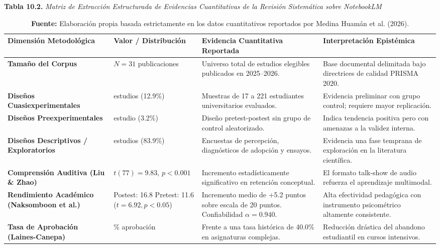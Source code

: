 \vspace{0.4cm}
\begin{table}[htpb!]
\centering
\small
\textbf{Tabla 10.2.} \textit{Matriz de Extracción Estructurada de Evidencias Cuantitativas de la Revisión Sistemática sobre NotebookLM}\\[0.25cm]
\footnotesize
\renewcommand{\arraystretch}{1.4}
\begin{tabularx}{\textwidth}{>{\raggedright\arraybackslash\bfseries}p{2.8cm} >{\raggedright\arraybackslash}p{2.2cm} >{\raggedright\arraybackslash}X >{\raggedright\arraybackslash}X}
\toprule
Dimensión Metodológica & Valor / Distribución & Evidencia Cuantitativa Reportada & Interpretación Epistémica \\
\midrule
Tamaño del Corpus & $N = 31$ publicaciones & Universo total de estudios elegibles publicados en 2025--2026. & Base documental delimitada bajo directrices de calidad PRISMA 2020. \\
Diseños Cuasiexperimentales & 4 estudios (12.9\%) & Muestras de 17 a 221 estudiantes universitarios evaluados. & Evidencia preliminar con grupo control; requiere mayor replicación. \\
Diseños Preexperimentales & 1 estudio (3.2\%) & Diseño pretest-postest sin grupo de control aleatorizado. & Indica tendencia positiva pero con amenazas a la validez interna. \\
Diseños Descriptivos / Exploratorios & 26 estudios (83.9\%) & Encuestas de percepción, diagnósticos de adopción y ensayos. & Evidencia una fase temprana de exploración en la literatura científica. \\
Comprensión Auditiva (Liu \& Zhao) & $t(77) = 9.83$, \quad $p < 0.001$ & Incremento estadísticamente significativo en retención conceptual. & El formato talk-show de audio refuerza el aprendizaje multimodal. \\
Rendimiento Académico (Naksomboon et al.) & Postest: 16.8 \newline Pretest: 11.6 \newline ($t = 6.92, p < 0.05$) & Incremento medio de +5.2 puntos sobre escala de 20 puntos. Confiabilidad $\alpha = 0.940$. & Alta efectividad pedagógica con instrumento psicométrico altamente consistente. \\
Tasa de Aprobación (Laines-Canepa) & 81.8\% aprobación & Frente a una tasa histórica de 40.0\% en asignaturas complejas. & Reducción drástica del abandono estudiantil en cursos intensivos. \\
\bottomrule
\end{tabularx}
\caption*{\scriptsize \textbf{Fuente:} Elaboración propia basada estrictamente en los datos cuantitativos reportados por Medina Huamán et al. (2026).}
\end{table}

